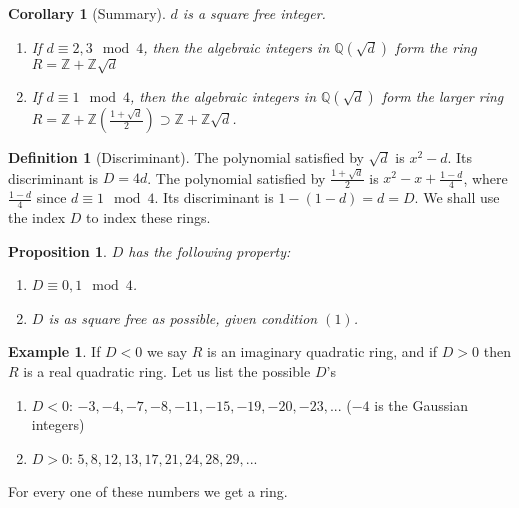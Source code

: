 \documentclass[12pt]{article}
\newtheorem{cor}[thm]{Corollary}
\newtheorem{prop}[thm]{Proposition}
\theoremstyle{definition}
\newtheorem{defn}[thm]{Definition}
\newtheorem{eg}[thm]{Example}
\theoremstyle{remark}
\numberwithin{equation}{section}
\newcommand\Z{\mathbb Z}    %
\newcommand\Q{\mathbb Q}    %
\begin{document}
\vspace{15pt}

\begin{cor}[Summary]
        $d$ is a square free integer. \begin{enumerate}
                \item If $d \equiv 2,3 \mod 4$, then the algebraic integers in $\Q(\sqrt{d})$ form the ring $R=\Z+\Z\sqrt{d}$
                \item If $d \equiv 1 \mod 4$, then the algebraic integers in $\Q(\sqrt{d})$ form the larger ring $R = \Z + \Z\left(\frac{1+\sqrt{d}}{2}\right) \supset \Z+\Z\sqrt{d}$. 
        \end{enumerate}
\end{cor}

\vspace{15pt}

\begin{defn}[Discriminant]
        The polynomial satisfied by $\sqrt{d}$ is $x^2-d$. Its discriminant is $D= 4d$. The polynomial satisfied by $\frac{1+\sqrt{d}}{2}$ is $x^2-x+\frac{1-d}{4}$, where $\frac{1-d}{4}$ since $d \equiv 1 \mod 4$. Its discriminant is $1 - (1-d) = d =D$. We shall use the index $D$ to index these rings.
\end{defn}

\vspace{15pt}

\begin{prop}
        $D$ has the following property:\begin{enumerate}
                \item $D\equiv 0,1 \mod 4$.
                \item $D$ is as square free as possible, given condition $(1)$.
        \end{enumerate}
\end{prop}


\vspace{15pt}

\begin{eg}
        If $D < 0$ we say $R$ is an imaginary quadratic ring, and if $D>0$ then $R$ is a real quadratic ring. Let us list the possible $D$'s \begin{enumerate}
                \item $D<0$: $-3,-4,-7,-8,-11,-15,-19,-20,-23,...$ ($-4$ is the Gaussian integers)
                \item $D>0$: $5,8,12,13,17,21,24,28,29,...$
        \end{enumerate}
        For every one of these numbers we get a ring.
\end{eg}
\end{document}
